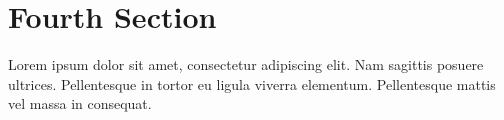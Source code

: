 \par\section{Fourth Section}
\par\noindent Lorem ipsum dolor sit amet, consectetur adipiscing elit. Nam sagittis posuere ultrices. Pellentesque in tortor eu ligula viverra elementum. Pellentesque mattis vel massa in consequat.